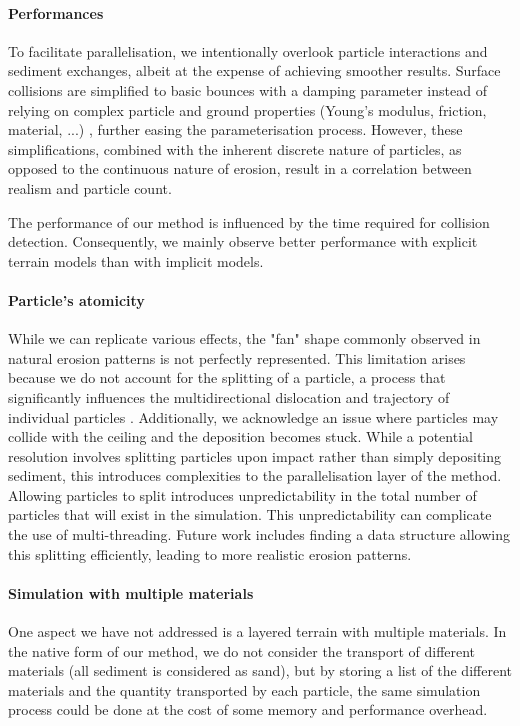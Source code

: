 \paragraph{Performances}
To facilitate parallelisation, we intentionally overlook particle interactions and sediment exchanges, albeit at the expense of achieving smoother results. Surface collisions are simplified to basic bounces with a damping parameter instead of relying on complex particle and ground properties (Young's modulus, friction, material, ...) \cite{Yan2020}, further easing the parameterisation process. However, these simplifications, combined with the inherent discrete nature of particles, as opposed to the continuous nature of erosion, result in a correlation between realism and particle count.

The performance of our method is influenced by the time required for collision detection. Consequently, we mainly observe better performance with explicit terrain models than with implicit models.

\paragraph{Particle's atomicity}
While we can replicate various effects, the "fan" shape commonly observed in natural erosion patterns is not perfectly represented. This limitation arises because we do not account for the splitting of a particle, a process that significantly influences the multidirectional dislocation and trajectory of individual particles \cite{Ranz1960}. Additionally, we acknowledge an issue where particles may collide with the ceiling and the deposition becomes stuck. While a potential resolution involves splitting particles upon impact rather than simply depositing sediment, this introduces complexities to the parallelisation layer of the method. Allowing particles to split introduces unpredictability in the total number of particles that will exist in the simulation. This unpredictability can complicate the use of multi-threading. Future work includes finding a data structure allowing this splitting efficiently, leading to more realistic erosion patterns.

\paragraph{Simulation with multiple materials}
One aspect we have not addressed is a layered terrain with multiple materials. In the native form of our method, we do not consider the transport of different materials (all sediment is considered as sand), but by storing a list of the different materials and the quantity transported by each particle, the same simulation process could be done at the cost of some memory and performance overhead.

